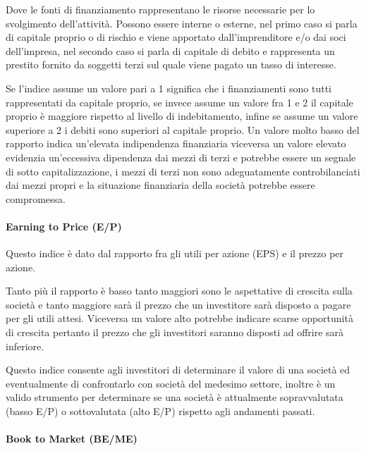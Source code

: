 Dove le fonti di finanziamento rappresentano le risorse necessarie per lo svolgimento dell'attività. Possono essere interne o esterne, nel primo caso si parla di capitale proprio o di rischio  e viene apportato dall'imprenditore e/o dai soci dell'impresa, nel secondo caso si parla di capitale di debito e rappresenta un prestito fornito da soggetti terzi sul quale viene pagato un tasso di interesse.

Se l'indice assume un valore pari a 1 significa che i finanziamenti sono tutti rappresentati da capitale proprio, se invece assume un valore fra 1 e 2 il capitale proprio è maggiore rispetto al livello di indebitamento, infine se assume un valore superiore a 2 i debiti sono superiori al capitale proprio. Un valore molto basso del rapporto indica un'elevata indipendenza finanziaria viceversa un valore elevato evidenzia un'eccessiva dipendenza dai mezzi di terzi e potrebbe essere un segnale di sotto capitalizzazione, i mezzi di terzi non sono adeguatamente controbilanciati dai mezzi propri e la situazione finanziaria della società potrebbe essere compromessa.

\paragraph{Earning to Price (E/P)}Questo indice è dato dal rapporto fra gli utili per azione (EPS) e il prezzo per azione. 

Tanto più il rapporto è basso tanto maggiori sono le aspettative di crescita sulla società e tanto maggiore sarà il prezzo che un investitore sarà disposto a pagare per gli utili attesi. Viceversa un valore alto potrebbe indicare scarse opportunità di crescita pertanto il prezzo che gli investitori saranno disposti ad offrire sarà inferiore. 

Questo indice consente agli investitori di determinare il valore di una società ed eventualmente di confrontarlo con società del medesimo settore, inoltre è un valido strumento per determinare se una società è attualmente sopravvalutata (basso E/P) o sottovalutata (alto E/P) rispetto agli andamenti passati.

\paragraph{Book to Market (BE/ME)}  

